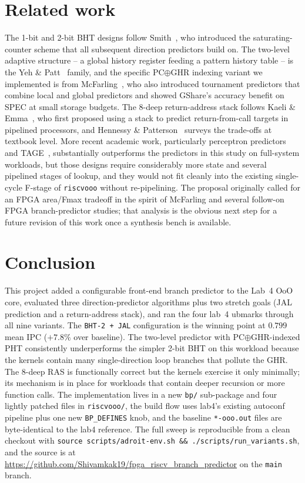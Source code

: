 \documentclass[10pt]{article}
\begin{document}
\section{Related work}

The 1-bit and 2-bit BHT designs follow Smith~\cite{smith1981}, who
introduced the saturating-counter scheme that all subsequent direction
predictors build on. The two-level adaptive structure -- a global
history register feeding a pattern history table -- is the
Yeh \& Patt~\cite{yehpatt1991,yehpatt1992} family, and the specific
PC$\oplus$GHR indexing variant we implemented is from
McFarling~\cite{mcfarling1993}, who also introduced tournament
predictors that combine local and global predictors and showed
GShare's accuracy benefit on SPEC at small storage budgets. The
8-deep return-address stack follows Kaeli \&
Emma~\cite{kaeliemma1991}, who first proposed using a stack to
predict return-from-call targets in pipelined processors, and
Hennessy \& Patterson~\cite{hp6e} surveys the trade-offs at textbook
level. More recent academic work, particularly perceptron
predictors~\cite{jimenez2001} and TAGE~\cite{seznec2006tage},
substantially outperforms the predictors in this study on full-system
workloads, but those designs require considerably more state and
several pipelined stages of lookup, and they would not fit cleanly
into the existing single-cycle F-stage of \texttt{riscvooo} without
re-pipelining. The proposal originally called for an FPGA area/Fmax
tradeoff in the spirit of McFarling and several follow-on FPGA
branch-predictor studies; that analysis is the obvious next step for
a future revision of this work once a synthesis bench is available.

\section{Conclusion}

This project added a configurable front-end branch predictor to the
Lab~4 OoO core, evaluated three direction-predictor algorithms plus
two stretch goals (JAL prediction and a return-address stack), and
ran the four lab~4 ubmarks through all nine variants. The
\texttt{BHT-2 + JAL} configuration is the winning point at $0.799$
mean IPC ($+7.8\%$ over baseline). The two-level predictor with
PC$\oplus$GHR-indexed PHT consistently underperforms the simpler
2-bit BHT on this workload because the kernels contain many
single-direction loop branches that pollute the GHR. The 8-deep RAS
is functionally correct but the kernels exercise it only minimally;
its mechanism is in place for workloads that contain deeper
recursion or more function calls. The implementation lives in a new
\texttt{bp/} sub-package and four lightly patched files in
\texttt{riscvooo/}, the build flow uses lab4's existing autoconf
pipeline plus one new \texttt{BP\_DEFINES} knob, and the baseline
\texttt{*-ooo.out} files are byte-identical to the lab4 reference.
The full sweep is reproducible from a clean checkout with
\texttt{source scripts/adroit-env.sh \&\& ./scripts/run\_variants.sh},
and the source is at
\url{https://github.com/Shivamkak19/fpga_riscv_branch_predictor}
on the \texttt{main} branch.
\end{document}
